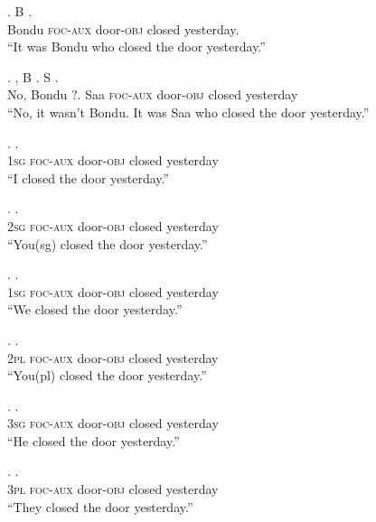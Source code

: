 \documentclass{assets/fieldnotes}
\begin{document}
\exg. B    .\\
Bondu \textsc{foc-aux} door-\textsc{obj} closed yesterday.\\
``It was Bondu who closed the door yesterday.''

\exg. , B . S    .\\
No, Bondu ?. Saa \textsc{foc-aux} door-\textsc{obj} closed yesterday\\
``No, it wasn't Bondu. It was Saa who closed the door yesterday.''


\exg.     .\\
1\textsc{sg} \textsc{foc-aux} door-\textsc{obj} closed yesterday\\
``I closed the door yesterday.''

\exg.     .\\
2\textsc{sg} \textsc{foc-aux} door-\textsc{obj} closed yesterday\\
``You(sg) closed the door yesterday.''

\exg.     .\\
1\textsc{sg} \textsc{foc-aux} door-\textsc{obj} closed yesterday\\
``We closed the door yesterday.''

\exg.     .\\
2\textsc{pl} \textsc{foc-aux} door-\textsc{obj} closed yesterday\\
``You(pl) closed the door yesterday.''

\exg.     .\\
3\textsc{sg} \textsc{foc-aux} door-\textsc{obj} closed yesterday\\
``He closed the door yesterday.''

\exg.     .\\
3\textsc{pl} \textsc{foc-aux} door-\textsc{obj} closed yesterday\\
``They closed the door yesterday.''
\end{document}
